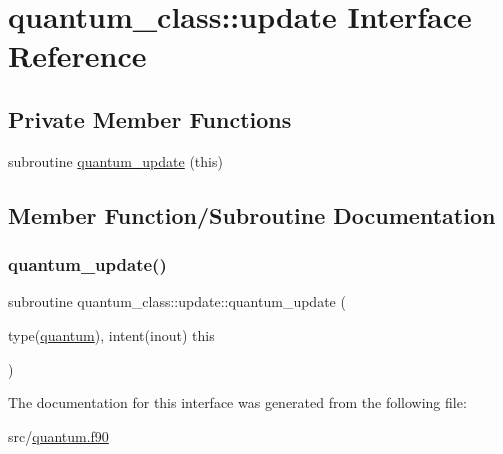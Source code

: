 \hypertarget{interfacequantum__class_1_1update}{}\section{quantum\+\_\+class\+:\+:update Interface Reference}
\label{interfacequantum__class_1_1update}
\subsection*{Private Member Functions}
\begin{DoxyCompactItemize}
\item 
subroutine \hyperlink{interfacequantum__class_1_1update_a520b337a8b391ad1f1d0963b81725a94}{quantum\+\_\+update} (this)
\end{DoxyCompactItemize}


\subsection{Member Function/\+Subroutine Documentation}
\mbox{\label{interfacequantum__class_1_1update_a520b337a8b391ad1f1d0963b81725a94}} 
\subsubsection{\texorpdfstring{quantum\+\_\+update()}{quantum\_update()}}
{\footnotesize\ttfamily subroutine quantum\+\_\+class\+::update\+::quantum\+\_\+update (\begin{DoxyParamCaption}\item[{type(\hyperlink{structquantum__class_1_1quantum}{quantum}), intent(inout)}]{this }\end{DoxyParamCaption})\hspace{0.3cm}{\ttfamily [private]}}



The documentation for this interface was generated from the following file\+:\begin{DoxyCompactItemize}
\item 
src/\hyperlink{quantum_8f90}{quantum.\+f90}\end{DoxyCompactItemize}
